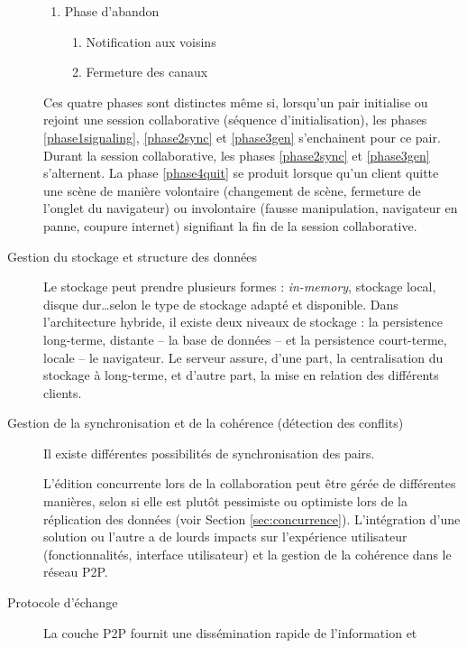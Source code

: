 \begin{description}
\begin{enumerate}
		\item Phase d'abandon
		\label{phase4quit}
		\begin{enumerate}
			\item Notification aux voisins 
			\item Fermeture des canaux
		\end{enumerate}
	\end{enumerate}
	
	Ces quatre phases sont distinctes même si, lorsqu'un pair initialise ou rejoint 
	une 
	session collaborative (séquence d'initialisation), les phases 
	\ref{phase1signaling}, \ref{phase2sync} et \ref{phase3gen} s'enchainent pour 
	ce pair. Durant la session collaborative, les phases \ref{phase2sync} et 
	\ref{phase3gen} s'alternent. La phase \ref{phase4quit} se produit lorsque qu'un 
	client quitte une scène de manière volontaire (changement de scène, fermeture 
	de l'onglet du navigateur) ou involontaire (fausse manipulation, navigateur en 
	panne, coupure internet) signifiant la fin de la session collaborative.
	
	\item [Gestion du stockage et structure des données] 
	Le stockage peut prendre plusieurs formes : \textit{in-memory}, stockage local, 
	disque dur\dots selon le type de stockage adapté et disponible. 
	Dans l'architecture hybride, il existe deux niveaux de stockage : la persistence 
	long-terme, distante -- la base de données -- et la persistence court-terme, 
	locale -- le navigateur.
	Le serveur assure, d'une part, la centralisation du stockage à long-terme, et 
	d'autre part, la mise en relation des différents clients.
	\item [Gestion de la synchronisation et de la cohérence (détection des conflits)] 
	Il existe différentes possibilités de synchronisation des pairs. 
	
	L'édition concurrente lors de la collaboration peut être gérée de différentes 
	manières, selon si elle est plutôt pessimiste ou optimiste lors de la réplication 
	des 
	données (voir Section \ref{sec:concurrence}). L'intégration d'une solution ou 
	l'autre 
	a de lourds impacts sur l'expérience utilisateur (fonctionnalités, interface 
	utilisateur) et la gestion de la cohérence dans le réseau \gls{P2P}.  
	
	\item [Protocole d'échange]
	La couche \gls{P2P} fournit une dissémination rapide de l'information et 
\end{description}


